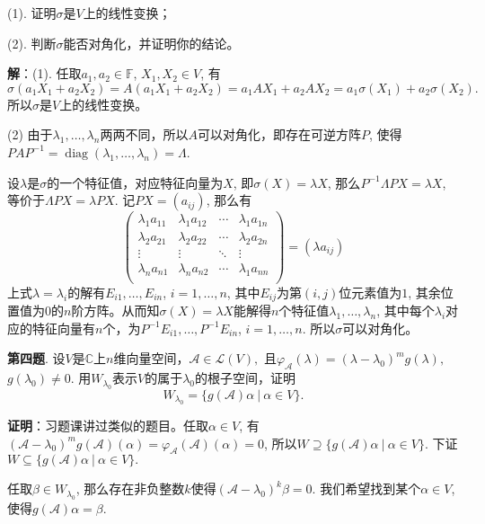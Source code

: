 (1). 证明$\sigma$是$V$上的线性变换；

(2). 判断$\sigma$能否对角化，并证明你的结论。

{\bf 解}：(1). 任取$a_1, a_2 \in \mathbb{F}$, $X_1, X_2 \in V$, 有
$$\sigma(a_1X_1 + a_2X_2) = A(a_1X_1 + a_2X_2) = a_1AX_1 + a_2AX_2 = a_1 \sigma(X_1) + a_2 \sigma(X_2).$$
所以$\sigma$是$V$上的线性变换。

(2) 由于$\lambda_1,\ldots,\lambda_n$两两不同，所以$A$可以对角化，即存在可逆方阵$P$, 使得$PAP^{-1} = \operatorname{diag}(\lambda_1, \ldots, \lambda_n) = \Lambda$.

设$\lambda$是$\sigma$的一个特征值，对应特征向量为$X$, 即$\sigma(X) = \lambda X$, 那么$P^{-1} \Lambda PX = \lambda X$, 等价于$\Lambda PX = \lambda PX$. 记$PX = (a_{ij})$, 那么有
$$
\begin{pmatrix}
\lambda_1 a_{11} & \lambda_1 a_{12} & \cdots & \lambda_1 a_{1n} \\
\lambda_2 a_{21} & \lambda_2 a_{22} & \cdots & \lambda_2 a_{2n} \\
\vdots & \vdots & \ddots & \vdots \\
\lambda_n a_{n1} & \lambda_n a_{n2} & \cdots & \lambda_1 a_{nn} \\
\end{pmatrix}
= (\lambda a_{ij})
$$
上式$\lambda = \lambda_i$的解有$E_{i1}, \ldots, E_{in}$, $i = 1, \ldots, n$, 其中$E_{ij}$为第$(i,j)$位元素值为$1$, 其余位置值为$0$的$n$阶方阵。从而知$\sigma(X) = \lambda X$能解得$n$个特征值$\lambda_1, \ldots, \lambda_n$, 其中每个$\lambda_i$对应的特征向量有$n$个，为$P^{-1}E_{i1}, \ldots, P^{-1}E_{in}$, $i = 1, \ldots, n$. 所以$\sigma$可以对角化。

\newpageorvspace


{\bf 第四题}. 设$V$是$\mathbb{C}$上$n$维向量空间，$\mathscr{A}\in\mathcal{L}(V),$ 且$\varphi_{\mathscr{A}}(\lambda) = (\lambda - \lambda_0)^m g(\lambda),$ $g(\lambda_0) \neq 0$. 用$W_{\lambda_0}$表示$V$的属于$\lambda_0$的根子空间，证明
$$W_{\lambda_0} = \{ g(\mathscr{A})\alpha \ |\ \alpha \in V \}.$$

{\bf 证明}：习题课讲过类似的题目。任取$\alpha \in V$, 有$(\mathscr{A} - \lambda_0)^m g(\mathscr{A}) (\alpha) = \varphi_{\mathscr{A}}(\mathscr{A}) (\alpha) = 0$, 所以$W \supseteq \{ g(\mathscr{A})\alpha \ |\ \alpha \in V \}.$ 下证$W \subseteq \{ g(\mathscr{A})\alpha \ |\ \alpha \in V \}.$

任取$\beta \in W_{\lambda_0}$, 那么存在非负整数$k$使得$(\mathscr{A} - \lambda_0)^k \beta = 0$. 我们希望找到某个$\alpha \in V$, 使得$g(\mathscr{A}) \alpha = \beta$.

